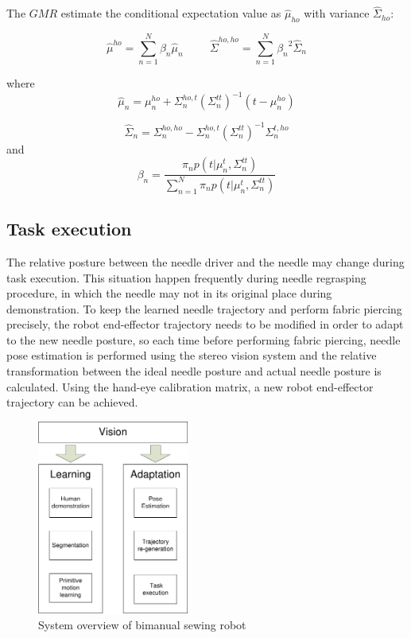 The $GMR$ estimate the conditional expectation value as $\hat{\mu}_{ho}$ with variance $\hat{\Sigma}_{ho}$:

\begin{equation}
{
\hat{\mu}^{ho} = \sum_{n=1}^N{\beta_n}\hat{\mu}_{n}
}
\hspace{1cm}
{
\hat{\Sigma}^{ho,ho} = \sum_{n=1}^N{\beta_n}^2\hat{\Sigma}_{n}
}
\end{equation}

where
\begin{equation}
{
\hat{\mu}_{n} = {\mu}_{n}^{ho} + \Sigma_{n}^{ho,t}({\Sigma}_{n}^{tt})^{-1}(t-{\mu}_{n}^{ho})
}
\end{equation}

\begin{equation}
{
\hat{\Sigma}_{n} = {\Sigma}_{n}^{ho,ho} - {\Sigma}_{n}^{ho,t}({\Sigma}_{n}^{tt})^{-1}{\Sigma}_{n}^{t,ho}
}
\end{equation}
and
\begin{equation}
{
\beta_n = \frac{\pi_{n}p(t|{\mu}_{n}^t,{\Sigma}_{n}^{tt})}
{\sum_{n=1}^N{\pi_n}p(t|{\mu}_{n}^t,{\Sigma}_{n}^{tt})}
}
\end{equation}



\subsection{Task execution}

The relative posture between the needle driver and the needle may change during task execution. This situation happen frequently during needle regrasping procedure, in which the needle may not in its original place during demonstration. To keep the learned needle trajectory and perform fabric piercing precisely, the robot end-effector trajectory needs to be modified in order to adapt to the new needle posture, so each time before performing fabric piercing, needle pose estimation is performed using the stereo vision system and the relative transformation between the ideal needle posture and actual needle posture is calculated. Using the hand-eye calibration matrix, a new robot end-effector trajectory can be achieved.



\begin{figure}
\centering
{
\includegraphics[width=5cm]{./fig/overview.pdf}
\caption{\scriptsize{System overview of bimanual sewing robot}}

\label{fig:overview}
}
\end{figure}

